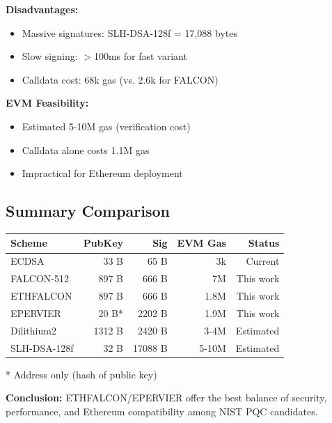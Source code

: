 \textbf{Disadvantages:}
\begin{itemize}
    \item Massive signatures: SLH-DSA-128f = 17,088 bytes
    \item Slow signing: $>$100ms for fast variant
    \item Calldata cost: 68k gas (vs. 2.6k for FALCON)
\end{itemize}

\textbf{EVM Feasibility:}
\begin{itemize}
    \item Estimated 5-10M gas (verification cost)
    \item Calldata alone costs 1.1M gas
    \item Impractical for Ethereum deployment
\end{itemize}

\subsection{Summary Comparison}

\begin{center}
\small
\begin{tabular}{lrrrr}
\hline
\textbf{Scheme} & \textbf{PubKey} & \textbf{Sig} & \textbf{EVM Gas} & \textbf{Status} \\
\hline
ECDSA & 33 B & 65 B & 3k & Current \\
FALCON-512 & 897 B & 666 B & 7M & This work \\
ETHFALCON & 897 B & 666 B & 1.8M & This work \\
EPERVIER & 20 B* & 2202 B & 1.9M & This work \\
Dilithium2 & 1312 B & 2420 B & 3-4M & Estimated \\
SLH-DSA-128f & 32 B & 17088 B & 5-10M & Estimated \\
\hline
\end{tabular}
\end{center}

* Address only (hash of public key)

\textbf{Conclusion:} ETHFALCON/EPERVIER offer the best balance of security, performance, and Ethereum compatibility among NIST PQC candidates.


